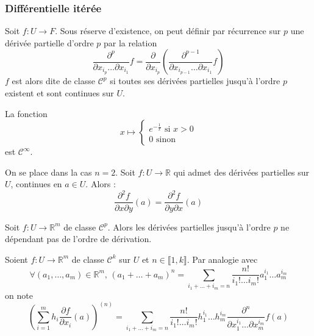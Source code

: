 	\subsubsection{Différentielle itérée}

	\begin{definition}
		Soit $f : U \rightarrow F$. Sous réserve d'existence, on peut définir par récurrence sur $p$ une dérivée partielle d'ordre $p$ par la relation
		\[ \frac{\partial^p}{\partial x_{i_p} \dots \partial x_{i_1}} f = \frac{\partial}{\partial x_{i_p}} \left( \frac{\partial^{p-1}}{\partial x_{i_{p-1}} \dots \partial x_{i_1}} f \right) \]
		$f$ est alors dite de classe $\mathcal{C}^p$ si toutes ses dérivées partielles jusqu'à l'ordre $p$ existent et sont continues sur $U$.
	\end{definition}


	\begin{example}
    La fonction
    \[
    x \mapsto \begin{cases}
      e^{-\frac{1}{x}} \text{ si } x > 0 \\
      0 \text{ sinon}
    \end{cases}
    \]
    est $\mathcal{C}^\infty$.
	\end{example}


	\begin{theorem}[Schwarz]
		On se place dans la cas $n = 2$. Soit $f : U \rightarrow \mathbb{R}$ qui admet des dérivées partielles sur $U$, continues en $a \in U$. Alors :
		\[ \frac{\partial^2 f}{\partial x \partial y}(a) = \frac{\partial^2 f}{\partial y \partial x}(a) \]
	\end{theorem}

	\begin{corollary}
		Soit $f : U \rightarrow \mathbb{R}^m$ de classe $\mathcal{C}^p$. Alors les dérivées partielles jusqu'à l'ordre $p$ ne dépendant pas de l'ordre de dérivation.
	\end{corollary}

	\begin{notation}
		Soient $f : U \rightarrow \mathbb{R}^m$ de classe $\mathcal{C}^k$ sur $U$ et $n \in \llbracket 1, k \rrbracket$. Par analogie avec
		\[ \forall (a_1, \dots, a_m) \in \mathbb{R}^m, \, (a_1 + \dots + a_m)^n = \sum_{i_1+\dots+i_m=n} \frac{n!}{i_1! \dots i_m!} a_1^{i_1} \dots a_m^{i_m} \]
		on note
		\[ \left( \sum_{i=1}^m h_i \frac{\partial f}{\partial x_i} (a) \right)^{(n)} = \sum_{i_1+\dots+i_m=n} \frac{n!}{i_1! \dots i_m!} h_1^{i_1} \dots h_m^{i_m} \frac{\partial^n}{\partial x_1^{i_1} \dots \partial x_m^{i_m}} f(a) \]
	\end{notation}

